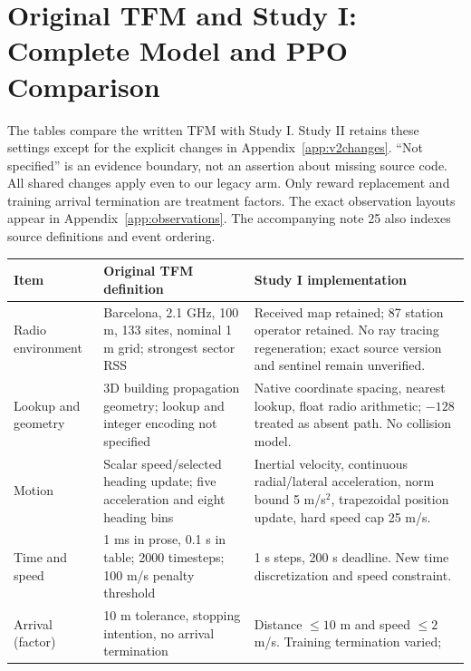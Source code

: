 \onecolumn
\appendices
\section{Original TFM and Study I: Complete Model and PPO Comparison}
\label{app:comparison}
The tables compare the written TFM with Study I. Study II retains these
settings except for the explicit changes in Appendix~\ref{app:v2changes}. ``Not
specified'' is an evidence boundary, not an assertion about missing source code.
All shared changes apply even to our legacy arm. Only reward replacement and
training arrival termination are treatment factors. The exact observation layouts appear in Appendix~\ref{app:observations}.
The accompanying note 25 also indexes source definitions and event ordering.

{\centering\footnotesize
{}
\label{tab:modelcomparison}
\begin{tabular}{@{}p{}p{}p{}@{}}
\toprule
Item & Original TFM definition & Study I implementation \\
\midrule
Radio environment & Barcelona, 2.1 GHz, 100 m, 133 sites, nominal 1 m grid;
strongest sector RSS~\cite[pp.~6--7, Sec.~3.1, Table~2]{thesis}
& Received map retained; 87 station operator retained. No ray tracing regeneration;
exact source version and sentinel remain unverified. \\
Lookup and geometry & 3D building propagation geometry; lookup and integer
encoding not specified~\cite[pp.~6--7, Sec.~3.1]{thesis}
& Native coordinate spacing, nearest lookup, float radio arithmetic; $-128$
treated as absent path. No collision model. \\
Motion & Scalar speed/selected heading update; five acceleration and eight
heading bins~\cite[p.~9, Eq.~(2); pp.~12, 15]{thesis}
& Inertial velocity, continuous radial/lateral acceleration, norm bound 5 m/s$^2$,
trapezoidal position update, hard speed cap 25 m/s. \\
Time and speed & 1 ms in prose, 0.1 s in table; 2000 timesteps; 100 m/s
penalty threshold~\cite[pp.~14--16, Tables~3--4]{thesis}
& 1 s steps, 200 s deadline. New time discretization and speed constraint. \\
Arrival (factor) & 10 m tolerance, stopping intention, no arrival termination
\cite[p.~9, Sec.~3.2; p.~12, Sec.~5.2; p.~15, Table~3]{thesis}
& Distance $\leq10$ m and speed $\leq2$ m/s. Training termination varied;

\end{tabular}}
